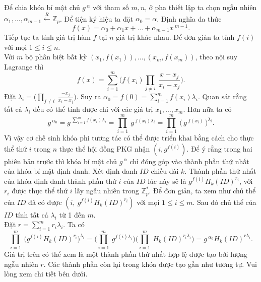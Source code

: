 \documentclass[class=report, crop=false]{standalone}
\begin{document}
			Để chia khóa bí mật chủ $g\,^\alpha$ với tham số $m, n$, ở pha thiết lập ta chọn ngẫu nhiên $\alpha_1, \dots, \alpha_{m - 1} \xleftarrow{R} \mathbb{Z}_p$. Để tiện ký hiệu ta đặt $\alpha_0 = \alpha$. Định nghĩa đa thức
			\[
				f(x) = \alpha_0 + \alpha_1x + \dots + \alpha_{m - 1}x\,^{m - 1}.
			\]
			\indent
			Tiếp tục ta tính giá trị hàm $f$ tại $n$ giá trị khác nhau. Để đơn giản ta tính $f(i)$ với mọi $1 \leq i \leq n$. \\ \indent
			Với $m$ bộ phân biệt bất kỳ $(x_1, f(x_1)), \dots, (x_m, f(x_m))$, theo nội suy Lagrange thì
			\[
				f(x) = \sum_{i = 1}^m \bigg(f(x_i) \prod_{j \neq i}\ \frac{x - x_j}{x_i - x_j} \bigg).
			\]
			\indent
			Đặt $\lambda_i = \bigg(\displaystyle\prod_{j \neq i}\ \frac{-x_j}{x_i - x_j} \bigg)$. Suy ra $\alpha_0 = f(0) = \displaystyle\sum_{i = 1}^m f(x_i)\lambda_i$. Quan sát rằng tất cả $\lambda_i$ đều có thể tính được chỉ với các giá trị $x_1, \dots, x_m$. Hơn nữa ta có
			\[
				g\,^{\alpha_0} = g\,^{\sum_{i = 1}^m f(x_i)\lambda_i} = \prod_{i = 1}^m \ g\,^{f(x_i)\lambda_i} = \prod_{i = 1}^m \ \Big(\, g\,^{f(x_i)}\, \Big)^{\lambda_i}.
			\]
			\indent
			Vì vậy cơ chế sinh khóa phi tương tác có thể được triển khai bằng cách cho thực thể thứ $i$ trong $n$ thực thể hội đồng PKG nhận $(i, g^{f(i)})$. Để ý rằng trong hai phiên bản trước thì khóa bí mật chủ $g\,^\alpha$ chỉ đóng góp vào thành phần thứ nhất của khóa bí mật định danh. Xét định danh $ID$ chiều dài $k$. Thành phần thứ nhất của khóa định danh thành phần thứ $i$ của $ID$ lúc này sẽ là $g^{f(i)} H_k(ID)^{r_i}$, với $r_i$ được thực thể thứ $i$ lấy ngẫu nhiên trong $\mathbb{Z}_p^*$. Để đơn giản, ta xem như chủ thể của $ID$ đã có được $(i,\ g^{f(i)} H_k(ID)^{r_i})$ với mọi $1 \leq i \leq m$. Sau đó chủ thể của $ID$ tính tất cả $\lambda_i$ từ 1 đến $m$. \\ \indent
			Đặt $r = \sum_{i = 1}^m r_i \lambda_i$. Ta có
			\[
				\prod_{i = 1}^m \ \Big(g^{f(i)} H_k(ID)^{r_i} \Big)^{\lambda_i} =
				\Big(\prod_{i = 1}^m \ g^{f(i)\lambda_i} \Big) \Big(\prod_{i = 1}^m \ H_k(ID)^{r_i \lambda_i} \Big) =
				g\,^{\alpha_0} H_k(ID)^{r \lambda_i}.
			\]
			\indent
			Giá trị trên có thể xem là một thành phần thứ nhất hợp lệ được tạo bởi lượng ngẫu nhiên $r$. Các thành phần còn lại trong khóa được tạo gần như tương tự. Vui lòng xem chi tiết bên dưới.
\end{document}
